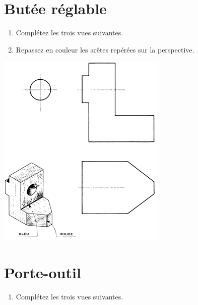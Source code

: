 \documentclass[11pt,oneside]{article}
\begin{document}
\section*{Butée réglable}

\begin{enumerate}
\item Complétez les trois vues suivantes.
\item Repassez en couleur les arêtes repérées sur la perspective.
\end{enumerate}

\begin{center}
\includegraphics[width=.6\textwidth]{png/fig1}
\end{center}

\section*{Porte-outil}

\begin{enumerate}
\item Complétez les trois vues suivantes.
\end{enumerate}
\end{document}
